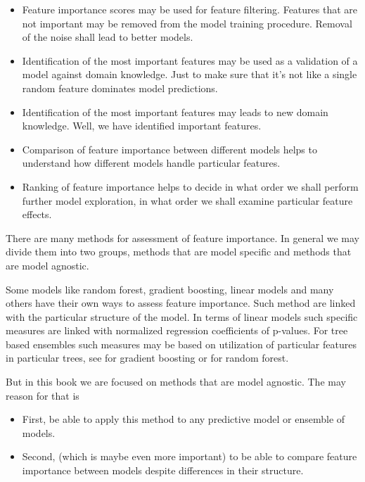 \documentclass[]{krantz}
\providecommand{\tightlist}{%
  \setlength{\itemsep}{0pt}\setlength{\parskip}{0pt}}
\theoremstyle{definition}
\theoremstyle{definition}
\theoremstyle{definition}
\theoremstyle{remark}
\begin{document}
\begin{itemize}
\tightlist
\item
  Feature importance scores may be used for feature filtering. Features
  that are not important may be removed from the model training
  procedure. Removal of the noise shall lead to better models.
\item
  Identification of the most important features may be used as a
  validation of a model against domain knowledge. Just to make sure that
  it's not like a single random feature dominates model predictions.
\item
  Identification of the most important features may leads to new domain
  knowledge. Well, we have identified important features.
\item
  Comparison of feature importance between different models helps to
  understand how different models handle particular features.
\item
  Ranking of feature importance helps to decide in what order we shall
  perform further model exploration, in what order we shall examine
  particular feature effects.
\end{itemize}

There are many methods for assessment of feature importance. In general
we may divide them into two groups, methods that are model specific and
methods that are model agnostic.

Some models like random forest, gradient boosting, linear models and
many others have their own ways to assess feature importance. Such
method are linked with the particular structure of the model. In terms
of linear models such specific measures are linked with normalized
regression coefficients of p-values. For tree based ensembles such
measures may be based on utilization of particular features in
particular trees, see \citep{xgboostExplainer} for gradient boosting or
\citep{randomForestExplainer} for random forest.

But in this book we are focused on methods that are model agnostic. The
may reason for that is

\begin{itemize}
\tightlist
\item
  First, be able to apply this method to any predictive model or
  ensemble of models.
\item
  Second, (which is maybe even more important) to be able to compare
  feature importance between models despite differences in their
  structure.
\end{itemize}
\end{document}
